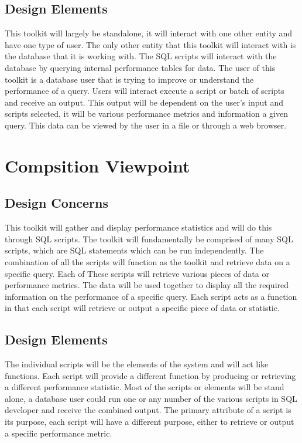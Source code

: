 \documentclass[draftclsnofoot, onecolumn, compsoc, 10pt]{IEEEtran}
\begin{document}
\subsection{Design Elements}
This toolkit will largely be standalone, it will interact with one other entity and have one type of user.
The only other entity that this toolkit will interact with is the database that it is working with.
The SQL scripts will interact with the database by querying internal performance tables for data.
The user of this toolkit is a database user that is trying to improve or understand the performance of a query.
Users will interact execute a script or batch of scripts and receive an output.
This output will be dependent on the user's input and scripts selected,  it will be various performance metrics and information a given query. This data can be viewed by the user in a file or through a web browser. 

\section{Compsition Viewpoint}
\subsection{Design Concerns}
This toolkit will gather and display performance statistics and will do this through SQL scripts.
The toolkit will fundamentally be comprised of many SQL scripts, which are SQL statements which can be run independently.
The combination of all the scripts will function as the toolkit and retrieve data on a specific query.
Each of These scripts will retrieve various pieces of data or performance metrics.
The data  will be used together to display all the required information on the performance of a specific query.
Each script acts as a function in that each script will retrieve or output a specific piece of data or statistic.

\subsection{Design Elements}
The individual scripts will be the elements of the system and will act like functions.
Each script will provide a different function by producing or retrieving a different performance statistic.
Most of the scripts or elements will be stand alone, a database user could run one or any number of the various scripts in SQL developer and receive the combined output.
The primary attribute of a script is its purpose, each script will have a different purpose, either to retrieve or output a specific performance metric.
\end{document}
